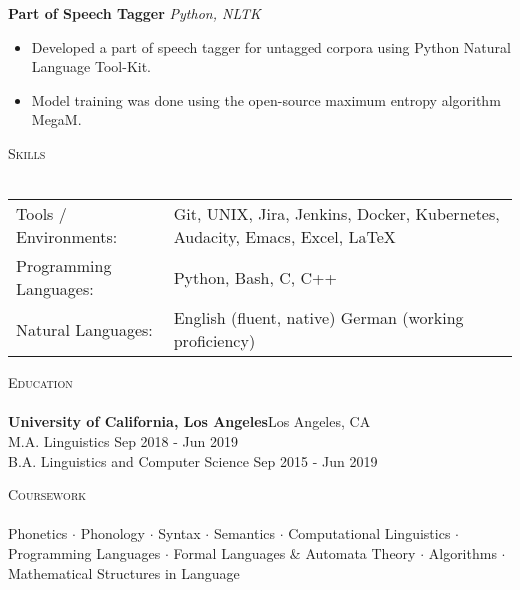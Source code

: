 \documentclass[]{article}
\newcommand{\lineunder} {
    \vspace*{-8pt} \\
    \hspace*{-18pt} \hrulefill \\
}
\newcommand{\header} [1] {
    {\hspace*{-18pt}\vspace*{6pt} \textsc{#1}}
    \vspace*{-6pt} \lineunder
}
\begin{document}
{\textbf{Part of Speech Tagger}} \hspace*{5mm} {\sl Python, NLTK} \\
\vspace*{-5pt}\begin{itemize}	\itemsep 0pt
	\item Developed a part of speech tagger for untagged corpora using Python Natural Language Tool-Kit.
	\item Model training was done using the open-source maximum entropy algorithm MegaM.
\end{itemize}
\vspace*{0mm}

\header{Skills}
\begin{tabular}{ l p{11.2cm} }
	Tools / Environments:  & Git, UNIX, Jira, Jenkins, Docker, Kubernetes, Audacity, Emacs, Excel, \LaTeX
	\\
	Programming Languages: & Python, Bash, C, C++
	\\
	Natural Languages:     & English \hfill (fluent, native) \newline German \hfill (working proficiency)
	\\
\end{tabular}
\vspace{2mm}


\header{Education}
\textbf{University of California, Los Angeles}\hfill Los Angeles, CA\\
M.A. Linguistics \hfill Sep 2018 - Jun 2019\\
\vspace{1mm}
B.A. Linguistics and Computer Science \hfill Sep 2015 - Jun 2019\\
\vspace{1mm}
\vspace{1mm}

\header{Coursework}
Phonetics $\cdot$ Phonology $\cdot$ Syntax $\cdot$ Semantics $\cdot$ Computational Linguistics $\cdot$ Programming Languages $\cdot$ Formal Languages \& Automata Theory $\cdot$ Algorithms $\cdot$ Mathematical Structures in Language
\vspace*{10mm}
\end{document}
